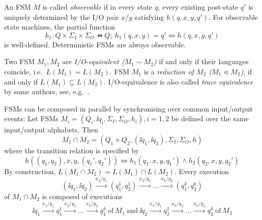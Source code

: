 An FSM $M$ is called \emph{observable} if in every state $q$, every existing post-state $q'$ is uniquely determined by the I/O pair $x/y$ satisfying $h(q,x,y,q')$. For
observable state machines, the partial function
$$
h_1 : Q\times\Sigma_I\times \Sigma_O \pfun Q;\    
h_1(q,x,y) = q' \Leftrightarrow h(q,x,y,q')
$$
is well-defined. Deterministic FSMs are always observable.

Two FSM $M_1, M_2$ are \emph{I/O-equivalent ($M_1\sim M_2$)} if and only if their languages coincide, i.e.~$L(M_1) = L(M_2)$. FSM $M_1$ is a \emph{reduction of $M_2$ ($M_1 \preceq M_2$)},
if and only if $L(M_1) \subseteq L(M_2)$. I/O-equivalence is also called 
\emph{trace equivalence} by some authors, see, e.g.~\cite{luo_test_1994}.



FSMs can be composed in parallel by synchronising over common input/output events:
Let FSMs $M_i=(Q_i, \ii{q_i}, \Sigma_I, \Sigma_O,  h_i), i = 1,2$ be defined over
the same input/output alphabets. Then 
$$
M_1 \cap M_2 = (Q_1\times Q_2, (\ii{q_1},\ii{q_2}),\Sigma_I, \Sigma_O, h)
$$
where the transition relation is specified by 
$$
h((q_1,q_2),x,y,(q_1',q_2')) \Leftrightarrow h_1(q_1,x,y,q_1') \wedge h_2(q_2,x,y,q_2')
$$
By construction, $L(M_1 \cap M_2) = L(M_1) \cap L(M_2)$. Every execution 
$$
(\ii{q_1},\ii{q_2}) \xrightarrow{x_1/y_1} (q_1^1,q_2^1) 
\xrightarrow{x_2/y_2} \dots \xrightarrow{x_k/y_k} (q_1^{k},q_2^{k})
$$
of 
$M_1\cap M_2$
is composed of executions 
$$
\ii{q_1} \xrightarrow{x_1/y_1} q_1^1 
\xrightarrow{x_2/y_2} \dots \xrightarrow{x_k/y_k} q_1^{k}\
\text{of}\ M_1\ \text{and}\ 
\ii{q_2} \xrightarrow{x_1/y_1} q_2^1 
\xrightarrow{x_2/y_2} \dots \xrightarrow{x_k/y_k} q_2^{k}\
\text{of}\ M_2
$$

